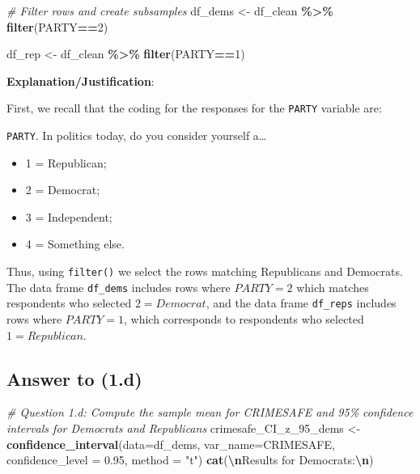 \documentclass[
  11pt,
]{article}
\newenvironment{Shaded}{\begin{snugshade}}{\end{snugshade}}
\newcommand{\AttributeTok}[1]{\textcolor[rgb]{0.13,0.29,0.53}{#1}}
\newcommand{\CommentTok}[1]{\textcolor[rgb]{0.56,0.35,0.01}{\textit{#1}}}
\newcommand{\DecValTok}[1]{\textcolor[rgb]{0.00,0.00,0.81}{#1}}
\newcommand{\FloatTok}[1]{\textcolor[rgb]{0.00,0.00,0.81}{#1}}
\newcommand{\FunctionTok}[1]{\textcolor[rgb]{0.13,0.29,0.53}{\textbf{#1}}}
\newcommand{\NormalTok}[1]{#1}
\newcommand{\OtherTok}[1]{\textcolor[rgb]{0.56,0.35,0.01}{#1}}
\newcommand{\SpecialCharTok}[1]{\textcolor[rgb]{0.81,0.36,0.00}{\textbf{#1}}}
\newcommand{\StringTok}[1]{\textcolor[rgb]{0.31,0.60,0.02}{#1}}
\providecommand{\tightlist}{%
  \setlength{\itemsep}{0pt}\setlength{\parskip}{0pt}}
\begin{document}
\begin{Shaded}
\begin{Highlighting}[]
\CommentTok{\# Filter rows and create subsamples}
\NormalTok{df\_dems }\OtherTok{\textless{}{-}}\NormalTok{ df\_clean }\SpecialCharTok{\%\textgreater{}\%}
  \FunctionTok{filter}\NormalTok{(PARTY}\SpecialCharTok{==}\DecValTok{2}\NormalTok{) }

\NormalTok{df\_rep }\OtherTok{\textless{}{-}}\NormalTok{ df\_clean }\SpecialCharTok{\%\textgreater{}\%}
  \FunctionTok{filter}\NormalTok{(PARTY}\SpecialCharTok{==}\DecValTok{1}\NormalTok{) }
\end{Highlighting}
\end{Shaded}

\textbf{Explanation/Justification}:

First, we recall that the coding for the responses for the
\texttt{PARTY} variable are:

\texttt{PARTY}. In politics today, do you consider yourself a\ldots{}

\begin{itemize}
\tightlist
\item
  1 = Republican;
\item
  2 = Democrat;
\item
  3 = Independent;
\item
  4 = Something else.
\end{itemize}

Thus, using \texttt{filter()} we select the rows matching Republicans
and Democrats. The data frame \texttt{df\_dems} includes rows where
\(PARTY=2\) which matches respondents who selected \(2 = Democrat\), and
the data frame \texttt{df\_reps} includes rows where \(PARTY=1\), which
corresponds to respondents who selected \(1 = Republican\).

\subsection{Answer to (1.d)}\label{answer-to-1.d}

\begin{Shaded}
\begin{Highlighting}[]
\CommentTok{\# Question 1.d: Compute the sample mean for \textasciigrave{}CRIMESAFE\textasciigrave{} and 95\% confidence intervals for Democrats and Republicans}
\NormalTok{crimesafe\_CI\_z\_95\_dems }\OtherTok{\textless{}{-}} \FunctionTok{confidence\_interval}\NormalTok{(}\AttributeTok{data=}\NormalTok{df\_dems, }
                                         \AttributeTok{var\_name=}\StringTok{\textquotesingle{}CRIMESAFE\textquotesingle{}}\NormalTok{, }
                                         \AttributeTok{confidence\_level =} \FloatTok{0.95}\NormalTok{, }\AttributeTok{method =} \StringTok{"t"}\NormalTok{)}
\FunctionTok{cat}\NormalTok{(}\StringTok{\textquotesingle{}}\SpecialCharTok{\textbackslash{}n}\StringTok{Results for Democrats:}\SpecialCharTok{\textbackslash{}n}\StringTok{\textquotesingle{}}\NormalTok{)}
\end{Highlighting}
\end{Shaded}
\end{document}
